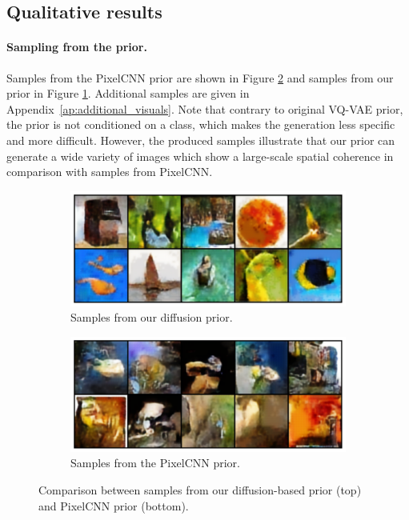 \documentclass{article}
\theoremstyle{plain}
\theoremstyle{definition}
\theoremstyle{remark}
\begin{document}
\subsection{Qualitative results}
\paragraph{Sampling from the prior. }
Samples from the PixelCNN prior are shown in Figure \ref{fig:pixel_samples}
and samples from our prior in Figure \ref{fig:diffusion_samples}. Additional samples are given in Appendix~\ref{ap:additional_visuals}. Note that contrary to original VQ-VAE prior, the prior is not conditioned on a class, which makes the generation less specific and more difficult. However, the produced samples illustrate that our prior can generate a wide variety of images which show a large-scale spatial coherence in comparison with samples from PixelCNN. 


\begin{figure}[h!]

\begin{subfigure}{\linewidth}
    \centering
    \includegraphics[width=.8\linewidth]{./samples2.pdf}
    \caption{Samples from our diffusion prior.}
    \label{fig:diffusion_samples}
\end{subfigure}
\begin{subfigure}{\linewidth}
    \centering
    \includegraphics[width=.8\linewidth]{./pixel_samples.pdf}
    \caption{Samples from the PixelCNN prior.}
    \label{fig:pixel_samples}
\end{subfigure}
\caption{Comparison between samples from our diffusion-based prior (top) and PixelCNN prior (bottom).}
\label{fig:figures}
\end{figure}
\end{document}
